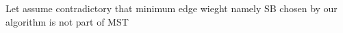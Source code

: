 \documentclass[preview]{standalone}
\begin{document}
\begin{center}
Let assume contradictory that minimum edge wieght namely SB chosen by our algorithm is not part of MST
\end{center}
\end{document}
